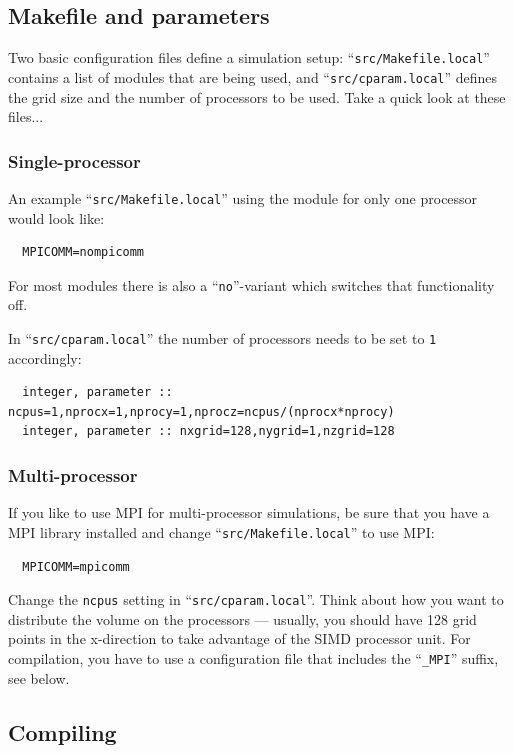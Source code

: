 \documentclass[a4paper,12pt]{article}
\newcommand{\file}[1]{``\texttt{#1}''}
\newcommand{\name}[1]{\textsc{#1}}
\newcommand{\code}[1]{\texttt{#1}}
\begin{document}
\subsection{Makefile and parameters}

Two basic configuration files define a simulation setup: \file{src/Makefile.local} contains a list of modules that are being used, and \file{src/cparam.local} defines the grid size and the number of processors to be used.
Take a quick look at these files...


\subsubsection{Single-processor}
An example \file{src/Makefile.local} using the module for only one processor would look like:
\begin{verbatim}
  MPICOMM=nompicomm
\end{verbatim}

For most modules there is also a \file{no}-variant which switches that functionality off.

In \file{src/cparam.local} the number of processors needs to be set to \code{1} accordingly:
\begin{verbatim}
  integer, parameter :: ncpus=1,nprocx=1,nprocy=1,nprocz=ncpus/(nprocx*nprocy)
  integer, parameter :: nxgrid=128,nygrid=1,nzgrid=128
\end{verbatim}

\subsubsection{Multi-processor}
If you like to use \name{MPI} for multi-processor simulations, be sure that you have a \name{MPI} library installed and change \file{src/Makefile.local} to use \name{MPI}:
\begin{verbatim}
  MPICOMM=mpicomm
\end{verbatim}

Change the \code{ncpus} setting in \file{src/cparam.local}.
Think about how you want to distribute the volume on the processors --- usually, you should have 128 grid points in the x-direction to take advantage of the SIMD processor unit.
For compilation, you have to use a configuration file that includes the \file{\_MPI} suffix, see below.

\subsection{Compiling}
\end{document}
